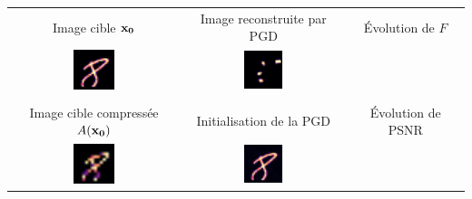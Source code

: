 \begin{tabular}{c c c}

Image cible $\bf{x_0}$  &  Image reconstruite par PGD  &  Évolution de $F$

\\

\includegraphics[width=0.25\textwidth]{resultats (legacy)/PGD/no-h-target-pas=1e-20_filtre=s-None.png}
&
\includegraphics[width=0.25\textwidth]{resultats (legacy)/PGD/no-h-guess-pas=1e-20_filtre=s-None.png}&


\\ \\

Image cible compressée $A(\bf{x_0})$  &  Initialisation de la PGD  & Évolution de PSNR

\\

\includegraphics[width=0.25\textwidth]{resultats (legacy)/PGD/no-h-comptarg-pas=1e-20_filtre=s-None.png}
&
\includegraphics[width=0.25\textwidth]{resultats (legacy)/PGD/no-h-init-pas=1e-20_filtre=s-None.png}
&


\end{tabular}